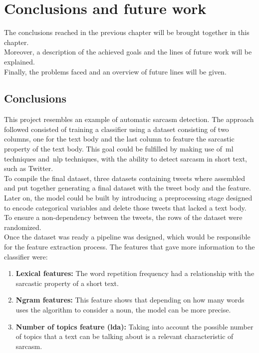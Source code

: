 \chapter{Conclusions and future work}
\label{chap:conclusions}
The conclusions reached in the previous chapter will be brought together in this chapter.\\
Moreover, a description of the achieved goals and the lines of future work will be explained.\\
Finally,  the problems faced and an overview of future lines will be given.

\section{Conclusions}
\label{sec:conclusions}
This project resembles an example of automatic sarcasm detection. The approach followed consisted of training a classifier using a dataset consisting of two columns, one for the text body and the last column to feature the sarcastic property of the text body. This goal could be fulfilled by making use of~\ac{ml} techniques and~\ac{nlp} techniques, with the ability to detect sarcasm in short text, such as Twitter.\\
To compile the final dataset, three datasets containing tweets where assembled and put together generating a final dataset with the tweet body and the feature.\\
Later on, the model could be built by introducing a preprocessing stage designed to encode categorical variables and delete those tweets that lacked a text body. To ensure a non-dependency between the tweets, the rows of the dataset were randomized.\\
Once the dataset was ready a pipeline was designed, which would be responsible for the feature extraction process. The features that gave more information to the classifier were:
\begin{enumerate}
	\item \textbf{Lexical features:} The word repetition frequency had a relationship with the sarcastic property of a short text.
	\item \textbf{Ngram features:} This feature shows that depending on how many words uses the algorithm to consider a noun, the model can be more precise.
	\item \textbf{Number of topics feature (\ac{lda}):} Taking into account the possible number of topics that a text can be talking about is a relevant characteristic of sarcasm.
\end{enumerate} 
